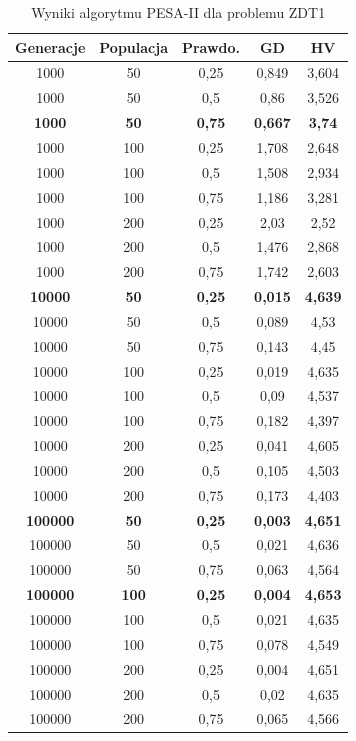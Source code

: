 \documentclass{classrep}
\begin{document}
\begin{table}[H]
\centering
\caption{Wyniki algorytmu PESA-II dla problemu ZDT1}
\label{tab:PESAII_ZDT1}
\begin{tabular}{|ccc|c|c|}
\hline
\textbf{Generacje} & \textbf{Populacja} & \textbf{Prawdo.} & \textbf{GD} & \textbf{HV} \\ \hline
1000 & 50 & 0,25 & 0,849 & 3,604 \\ \hline
1000 & 50 & 0,5 & 0,86 & 3,526 \\ \hline
\textbf{1000} & \textbf{50} & \textbf{0,75} & \textbf{0,667} & \textbf{3,74} \\ \hline
1000 & 100 & 0,25 & 1,708 & 2,648 \\ \hline
1000 & 100 & 0,5 & 1,508 & 2,934 \\ \hline
1000 & 100 & 0,75 & 1,186 & 3,281 \\ \hline
1000 & 200 & 0,25 & 2,03 & 2,52 \\ \hline
1000 & 200 & 0,5 & 1,476 & 2,868 \\ \hline
1000 & 200 & 0,75 & 1,742 & 2,603 \\ \hline
\textbf{10000} & \textbf{50} & \textbf{0,25} & \textbf{0,015} & \textbf{4,639} \\ \hline
10000 & 50 & 0,5 & 0,089 & 4,53 \\ \hline
10000 & 50 & 0,75 & 0,143 & 4,45 \\ \hline
10000 & 100 & 0,25 & 0,019 & 4,635 \\ \hline
10000 & 100 & 0,5 & 0,09 & 4,537 \\ \hline
10000 & 100 & 0,75 & 0,182 & 4,397 \\ \hline
10000 & 200 & 0,25 & 0,041 & 4,605 \\ \hline
10000 & 200 & 0,5 & 0,105 & 4,503 \\ \hline
10000 & 200 & 0,75 & 0,173 & 4,403 \\ \hline
\textbf{100000} & \textbf{50} & \textbf{0,25} & \textbf{0,003} & \textbf{4,651} \\ \hline
100000 & 50 & 0,5 & 0,021 & 4,636 \\ \hline
100000 & 50 & 0,75 & 0,063 & 4,564 \\ \hline
\textbf{100000} & \textbf{100} & \textbf{0,25} & \textbf{0,004} & \textbf{4,653} \\ \hline
100000 & 100 & 0,5 & 0,021 & 4,635 \\ \hline
100000 & 100 & 0,75 & 0,078 & 4,549 \\ \hline
100000 & 200 & 0,25 & 0,004 & 4,651 \\ \hline
100000 & 200 & 0,5 & 0,02 & 4,635 \\ \hline
100000 & 200 & 0,75 & 0,065 & 4,566 \\ \hline
\end{tabular}
\end{table}
\end{document}

